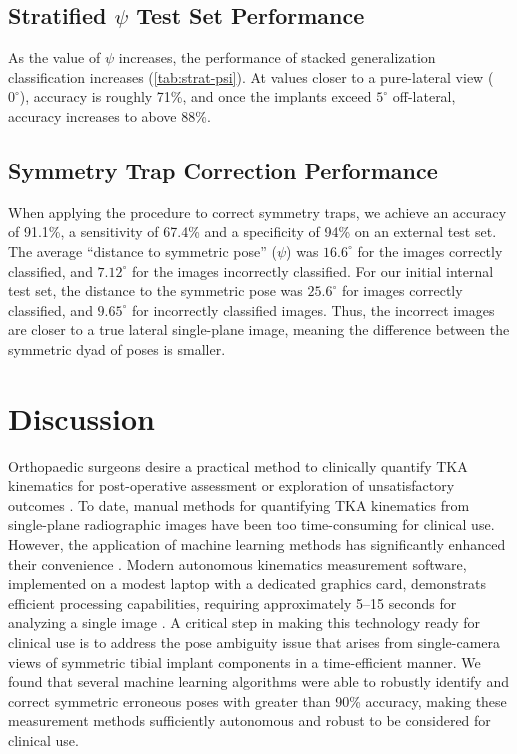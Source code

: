 \subsection{Stratified $\psi$ Test Set Performance}
As the value of $\psi$ increases, the performance of stacked generalization classification increases (\cref{tab:strat-psi}).
At values closer to a pure-lateral view (~$0^{\circ}$), accuracy is roughly 71\%, and once the implants exceed $5^{\circ}$ off-lateral, accuracy increases to above 88\%.



\subsection{Symmetry Trap Correction Performance}
When applying the procedure to correct symmetry traps, we achieve an accuracy of 91.1\%, a sensitivity of 67.4\% and a specificity of 94\% on an external test set.
The average “distance to symmetric pose” ($\psi$) was $16.6^{\circ}$ for the images correctly classified, and $7.12^{\circ}$ for the images incorrectly classified.
For our initial internal test set, the distance to the symmetric pose was $25.6^{\circ}$ for images correctly classified, and $9.65^{\circ}$ for incorrectly classified images.
Thus, the incorrect images are closer to a true lateral single-plane image, meaning the difference between the symmetric dyad of poses is smaller.

\section{Discussion}
Orthopaedic surgeons desire a practical method to clinically quantify TKA kinematics for post-operative assessment or exploration of unsatisfactory outcomes \cite{banksWhatPostoperativeOutcome2017}.
To date, manual methods for quantifying TKA kinematics from single-plane radiographic images have been too time-consuming for clinical use. However, the application of machine learning methods has significantly enhanced their convenience \cite{jensenJointTrackMachine2023}.
Modern autonomous kinematics measurement software, implemented on a modest laptop with a dedicated graphics card, demonstrats efficient processing capabilities, requiring approximately 5–15 seconds for analyzing a single image \cite{jensenJointTrackMachine2023}.
A critical step in making this technology ready for clinical use is to address the pose ambiguity issue that arises from single-camera views of symmetric tibial implant components in a time-efficient manner.
We found that several machine learning algorithms were able to robustly identify and correct symmetric erroneous poses with greater than 90\% accuracy, making these measurement methods sufficiently autonomous and robust to be considered for clinical use.

